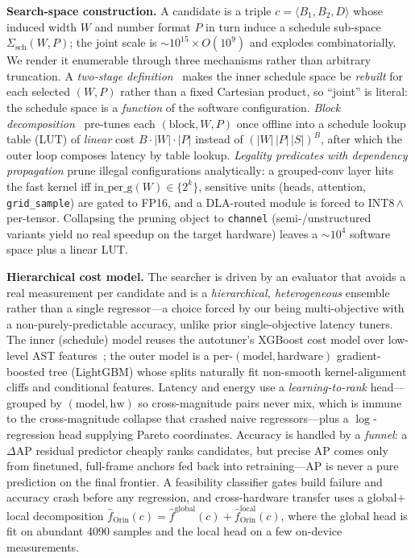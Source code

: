 \documentclass[letterpaper]{article} %
\begin{document}
\noindent\textbf{Search-space construction.}
A candidate is a triple $c=\langle B_1,B_2,D\rangle$ whose induced width $W$
and number format $P$ in turn induce a schedule sub-space
$\Sigma_{\mathrm{sch}}(W,P)$; the joint scale is
$\sim\!10^{15}\times O(10^{9})$ and explodes combinatorially. We render it
enumerable through three mechanisms rather than arbitrary truncation. A
\emph{two-stage definition}~\cite{xu2023alt} makes the inner schedule space
be \emph{rebuilt} for each selected $(W,P)$ rather than a fixed Cartesian
product, so ``joint'' is literal: the schedule space is a \emph{function} of
the software configuration. \emph{Block decomposition}~\cite{shu2021chanas}
pre-tunes each $(\text{block},W,P)$ once offline into a schedule lookup table
(LUT) of \emph{linear} cost $B\cdot|W|\cdot|P|$ instead of
$(|W|\,|P|\,|S|)^{B}$, after which the outer loop composes latency by table
lookup. \emph{Legality predicates with dependency propagation} prune illegal
configurations analytically: a grouped-conv layer hits the fast kernel iff
$\mathrm{in\_per\_g}(W)\in\{2^{k}\}$, sensitive units (heads, attention,
\texttt{grid\_sample}) are gated to FP16, and a DLA-routed module is forced
to INT8\,$\wedge$\,per-tensor. Collapsing the pruning object to
\texttt{channel} (semi-/unstructured variants yield no real speedup on the
target hardware) leaves a $\sim\!10^{4}$ software space plus a linear LUT.

\noindent\textbf{Hierarchical cost model.}
The searcher is driven by an evaluator that avoids a real measurement per
candidate and is a \emph{hierarchical, heterogeneous} ensemble rather than a
single regressor---a choice forced by our being multi-objective with a
non-purely-predictable accuracy, unlike prior single-objective latency
tuners. The inner (schedule) model reuses the autotuner's XGBoost cost model
over low-level AST features~\cite{chen2018learning}; the outer model is a
per-$(\text{model},\text{hardware})$ gradient-boosted tree (LightGBM) whose
splits naturally fit non-smooth kernel-alignment cliffs and conditional
features. Latency and energy use a \emph{learning-to-rank} head---grouped by
$(\text{model},\text{hw})$ so cross-magnitude pairs never mix, which is
immune to the cross-magnitude collapse that crashed naive regressors---plus a
$\log$-regression head supplying Pareto coordinates. Accuracy is handled by a
\emph{funnel}: a $\Delta\mathrm{AP}$ residual predictor cheaply ranks
candidates, but precise AP comes only from finetuned, full-frame anchors fed
back into retraining---AP is never a pure prediction on the final frontier. A
feasibility classifier gates build failure and accuracy crash before any
regression, and cross-hardware transfer uses a global$+$local decomposition
$\hat f_{\mathrm{Orin}}(c)=\hat f^{\mathrm{global}}(c)+\hat
f^{\mathrm{local}}_{\mathrm{Orin}}(c)$, where the global head is fit on
abundant 4090 samples and the local head on a few on-device measurements.
\end{document}
